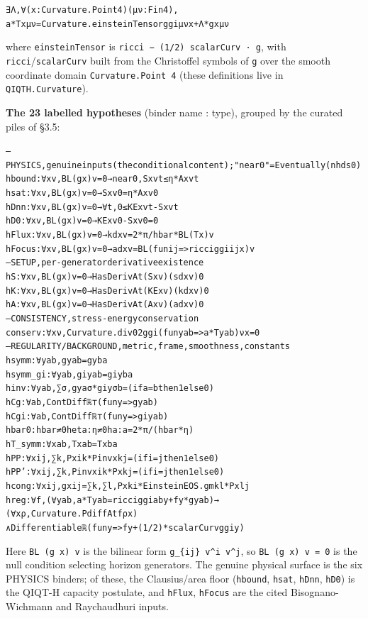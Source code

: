 \documentclass[11pt]{article}
\begin{document}
{\footnotesize\begin{alltt}
∃ Λ, ∀ (x : Curvature.Point 4) (μ ν : Fin 4),
    a * T x μ ν = Curvature.einsteinTensor g gi μ ν x + Λ * g x μ ν
\end{alltt}}

where \texttt{einsteinTensor} is \texttt{ricci − (1/2) scalarCurv · g}, with \texttt{ricci}/\texttt{scalarCurv} built from the
Christoffel symbols of \texttt{g} over the smooth coordinate domain \texttt{Curvature.Point 4} (these definitions
live in \texttt{QIQTH.Curvature}).

\textbf{The 23 labelled hypotheses} (binder name : type), grouped by the curated piles of §3.5:

{\footnotesize\begin{alltt}
-- PHYSICS, genuine inputs (the conditional content); "near 0" = Eventually (nhds 0)
hbound  : ∀ x v, BL (g x) v = 0 → near 0,  S x v t ≤ η * A x v t
hsat    : ∀ x v, BL (g x) v = 0 → S x v 0 = η * A x v 0
hDnn    : ∀ x v, BL (g x) v = 0 → ∀ t, 0 ≤ KE x v t - S x v t
hD0     : ∀ x v, BL (g x) v = 0 → KE x v 0 - S x v 0 = 0
hFlux   : ∀ x v, BL (g x) v = 0 → kd x v = 2*π/hbar * BL (T x) v
hFocus  : ∀ x v, BL (g x) v = 0 → ad x v = BL (fun i j => ricci g gi i j x) v
-- SETUP, per-generator derivative existence
hS : ∀ x v, BL (g x) v = 0 → HasDerivAt (S  x v) (sd x v) 0
hK : ∀ x v, BL (g x) v = 0 → HasDerivAt (KE x v) (kd x v) 0
hA : ∀ x v, BL (g x) v = 0 → HasDerivAt (A  x v) (ad x v) 0
-- CONSISTENCY, stress-energy conservation
conserv : ∀ x ν, Curvature.div02 g gi (fun y a b => a * T y a b) ν x = 0
-- REGULARITY / BACKGROUND, metric, frame, smoothness, constants
hsymm    : ∀ y a b, g  y a b = g  y b a
hsymm_gi : ∀ y a b, gi y a b = gi y b a
hinv     : ∀ y a b, ∑ σ, g y a σ * gi y σ b = (if a = b then 1 else 0)
hCg      : ∀ a b, ContDiff ℝ ⊤ (fun y => g  y a b)
hCgi     : ∀ a b, ContDiff ℝ ⊤ (fun y => gi y a b)
hbar0    : hbar ≠ 0          heta : η ≠ 0          ha : a = 2 * π / (hbar * η)
hT_symm  : ∀ x a b, T x a b = T x b a
hPP      : ∀ x i j, ∑ k, P x i k * Pinv x k j = (if i = j then 1 else 0)
hPP'     : ∀ x i j, ∑ k, Pinv x i k * P x k j = (if i = j then 1 else 0)
hcong    : ∀ x i j, g x i j = ∑ k, ∑ l, P x k i * EinsteinEOS.gm k l * P x l j
hreg     : ∀ f, (∀ y a b, a * T y a b = ricci g gi a b y + f y * g y a b) →
                (∀ x ρ, Curvature.PdiffAt f ρ x)
                  ∧ Differentiable ℝ (fun y => f y + (1/2) * scalarCurv g gi y)
\end{alltt}}

Here \texttt{BL (g x) v} is the bilinear form \texttt{g\_\{ij\} v\textasciicircum{}i v\textasciicircum{}j}, so \texttt{BL (g x) v = 0} is the null condition
selecting horizon generators. The genuine physical surface is the six PHYSICS binders; of these, the
Clausius/area floor (\texttt{hbound}, \texttt{hsat}, \texttt{hDnn}, \texttt{hD0}) is the QIQT-H capacity postulate, and \texttt{hFlux},
\texttt{hFocus} are the cited Bisognano-Wichmann and Raychaudhuri inputs.
\end{document}
